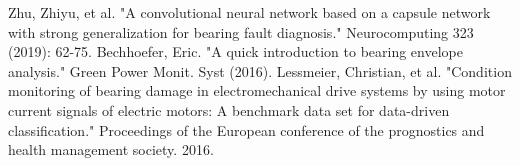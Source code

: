 \documentclass[conference]{IEEEtran}
\begin{document}
\begin{thebibliography}{00}
 Zhu, Zhiyu, et al. "A convolutional neural network based on a capsule network with strong generalization for bearing fault diagnosis." Neurocomputing 323 (2019): 62-75.
 Bechhoefer, Eric. "A quick introduction to bearing envelope analysis." Green Power Monit. Syst (2016).
 Lessmeier, Christian, et al. "Condition monitoring of bearing damage in electromechanical drive systems by using motor current signals of electric motors: A benchmark data set for data-driven classification." Proceedings of the European conference of the prognostics and health management society. 2016.
\end{thebibliography}
\vspace{12pt}
\end{document}
